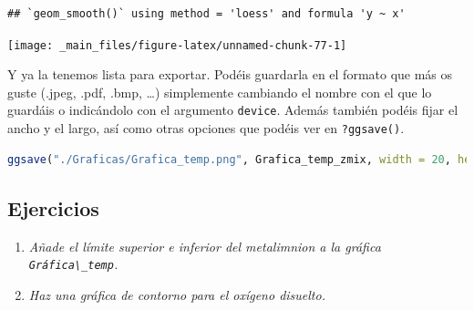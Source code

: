 \documentclass[
]{book}
\newcommand{\passthrough}[1]{#1}
\providecommand{\tightlist}{%
  \setlength{\itemsep}{0pt}\setlength{\parskip}{0pt}}
\begin{document}
\begin{lstlisting}
## `geom_smooth()` using method = 'loess' and formula 'y ~ x'
\end{lstlisting}

\texttt{[image: \_main\_files/figure-latex/unnamed-chunk-77-1]}

Y ya la tenemos lista para exportar. Podéis guardarla en el formato que más os guste (.jpeg, .pdf, .bmp, \ldots) simplemente cambiando el nombre con el que lo guardáis o indicándolo con el argumento \passthrough{\lstinline!device!}. Además también podéis fijar el ancho y el largo, así como otras opciones que podéis ver en \passthrough{\lstinline!?ggsave()!}.

\begin{lstlisting}[language=R]
ggsave("./Graficas/Grafica_temp.png", Grafica_temp_zmix, width = 20, height = 10, units = "cm")
\end{lstlisting}

\hypertarget{ejercicios-7}{%
\subsection{Ejercicios}\label{ejercicios-7}}

\begin{enumerate}
\def\labelenumi{\arabic{enumi}.}
\tightlist
\item
  \emph{Añade el límite superior e inferior del metalimnion a la gráfica \passthrough{\lstinline!Gráfica\_temp!}.}
\item
  \emph{Haz una gráfica de contorno para el oxígeno disuelto.}
\end{enumerate}

\backmatter

  
\end{document}
